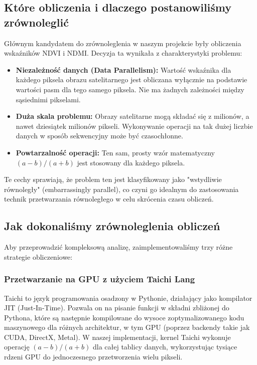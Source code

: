 \documentclass[12pt,a4paper]{article}
\begin{document}
\subsection{Które obliczenia i dlaczego postanowiliśmy zrównoleglić}
Głównym kandydatem do zrównoleglenia w naszym projekcie były obliczenia wskaźników NDVI i NDMI. Decyzja ta wynikała z charakterystyki problemu:
\begin{itemize}
    \item \textbf{Niezależność danych (Data Parallelism):} Wartość wskaźnika dla każdego piksela obrazu satelitarnego jest obliczana wyłącznie na podstawie wartości pasm dla tego samego piksela. Nie ma żadnych zależności między sąsiednimi pikselami.
    \item \textbf{Duża skala problemu:} Obrazy satelitarne mogą składać się z milionów, a nawet dziesiątek milionów pikseli. Wykonywanie operacji na tak dużej liczbie danych w sposób sekwencyjny może być czasochłonne.
    \item \textbf{Powtarzalność operacji:} Ten sam, prosty wzór matematyczny \((a-b)/(a+b)\) jest stosowany dla każdego piksela.
\end{itemize}
Te cechy sprawiają, że problem ten jest klasyfikowany jako "wstydliwie równoległy" (embarrassingly parallel), co czyni go idealnym do zastosowania technik przetwarzania równoległego w celu skrócenia czasu obliczeń.

\subsection{Jak dokonaliśmy zrównoleglenia obliczeń}
Aby przeprowadzić kompleksową analizę, zaimplementowaliśmy trzy różne strategie obliczeniowe:

\subsubsection{Przetwarzanie na GPU z użyciem Taichi Lang}
Taichi to język programowania osadzony w Pythonie, działający jako kompilator JIT (Just-In-Time). Pozwala on na pisanie funkcji w składni zbliżonej do Pythona, które są następnie kompilowane do wysoce zoptymalizowanego kodu maszynowego dla różnych architektur, w tym GPU (poprzez backendy takie jak CUDA, DirectX, Metal). W naszej implementacji, kernel Taichi wykonuje operację \((a-b)/(a+b)\) dla całej tablicy danych, wykorzystując tysiące rdzeni GPU do jednoczesnego przetworzenia wielu pikseli.
\end{document}
